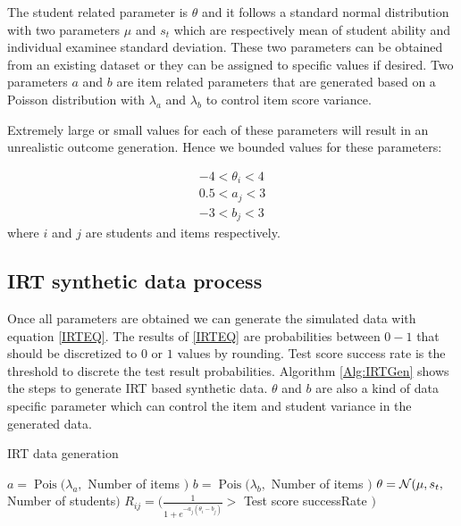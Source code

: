 The student related parameter is $\theta$ and it follows a standard normal distribution with two parameters $\mu$ and $s_t$ which are respectively mean of student ability and individual examinee standard deviation. These two parameters can be obtained from an existing dataset or they can be assigned to specific values if desired. Two parameters $a$ and $b$ are item related parameters that are generated based on a Poisson distribution with $\lambda_a$ and $\lambda_b$ to control item score variance.

Extremely large or small values for each of these parameters will result in an unrealistic outcome generation. Hence we bounded values for these parameters:

\begin{eqnarray*}
-4 < \theta_i < 4\\
0.5 < a_j < 3\\
-3 < b_j < 3
\end{eqnarray*}
where $i$ and $j$ are students and items respectively.

\subsection{IRT synthetic data process}

Once all parameters are obtained we can generate the simulated data with equation \ref{IRTEQ}. The results of \ref{IRTEQ} are probabilities between $0-1$ that should be discretized to $0$ or $1$ values by rounding. Test score success rate is the threshold to discrete the test result probabilities. Algorithm \ref{Alg:IRTGen} shows the steps to generate IRT based synthetic data. $\theta$ and $b$ are also a kind of data specific parameter which can control the item and student variance in the generated data.

\begin{algorithm}
\caption{IRT data generation}
\label{CHalgorithm}
\begin{algorithmic}[1]
\State $a = \operatorname{Pois} ({\lambda_a},$ Number of items $)$
\State $b = \operatorname{Pois} ({\lambda_b},$ Number of items $)$
\State $\theta = \mathcal{N}(\mu, s_t ,$ Number of students$)$
\State $R_{ij} = (\frac{1}{1+e^{-a_j(\theta_i-b_j)}} >$ Test score successRate $)$
\EndFor
\EndFor
\end{algorithmic}
\label{Alg:IRTGen}
\end{algorithm}



